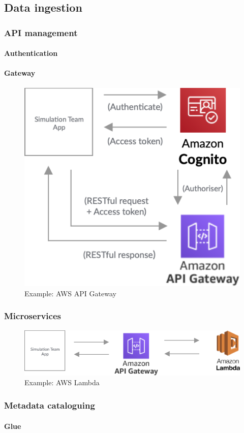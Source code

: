 \documentclass[10pt]{article}
\begin{document}
\subsection{Data ingestion}
\subsubsection{API management}
\paragraph{Authentication}
\paragraph{Gateway}

\begin{figure}[h!]
	\centering
	\includegraphics[width=0.4\linewidth]{images/APIGateway.png}	
	\caption*{Example: AWS API Gateway}
\end{figure}

\subsubsection{Microservices}

\begin{figure}[h!]
	\centering
	\includegraphics[width=0.6\linewidth]{images/Lambda.png}
	\caption*{Example: AWS Lambda}	
\end{figure}

\subsubsection{Metadata cataloguing}
\paragraph{Glue}
\end{document}
